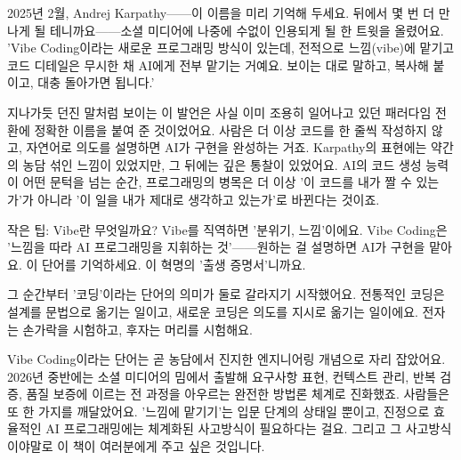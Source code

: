 


2025년 2월, Andrej Karpathy——이 이름을 미리 기억해 두세요. 뒤에서 몇 번 더 만나게 될 테니까요——소셜 미디어에 나중에 수없이 인용되게 될 한 트윗을 올렸어요. 'Vibe Coding이라는 새로운 프로그래밍 방식이 있는데, 전적으로 느낌(vibe)에 맡기고 코드 디테일은 무시한 채 AI에게 전부 맡기는 거예요. 보이는 대로 말하고, 복사해 붙이고, 대충 돌아가면 됩니다.'

지나가듯 던진 말처럼 보이는 이 발언은 사실 이미 조용히 일어나고 있던 패러다임 전환에 정확한 이름을 붙여 준 것이었어요. 사람은 더 이상 코드를 한 줄씩 작성하지 않고, 자연어로 의도를 설명하면 AI가 구현을 완성하는 거죠. Karpathy의 표현에는 약간의 농담 섞인 느낌이 있었지만, 그 뒤에는 깊은 통찰이 있었어요. AI의 코드 생성 능력이 어떤 문턱을 넘는 순간, 프로그래밍의 병목은 더 이상 '이 코드를 내가 짤 수 있는가'가 아니라 '이 일을 내가 제대로 생각하고 있는가'로 바뀐다는 것이죠.

\begin{tcbinfo}{작은 팁: Vibe란 무엇일까요?}
Vibe를 직역하면 '분위기, 느낌'이에요. Vibe Coding은 '느낌을 따라 AI 프로그래밍을 지휘하는 것'——원하는 걸 설명하면 AI가 구현을 맡아요. 이 단어를 기억하세요. 이 혁명의 '출생 증명서'니까요.

\end{tcbinfo}

그 순간부터 '코딩'이라는 단어의 의미가 둘로 갈라지기 시작했어요. 전통적인 코딩은 설계를 문법으로 옮기는 일이고, 새로운 코딩은 의도를 지시로 옮기는 일이에요. 전자는 손가락을 시험하고, 후자는 머리를 시험해요.

Vibe Coding이라는 단어는 곧 농담에서 진지한 엔지니어링 개념으로 자리 잡았어요. 2026년 중반에는 소셜 미디어의 밈에서 출발해 요구사항 표현, 컨텍스트 관리, 반복 검증, 품질 보증에 이르는 전 과정을 아우르는 완전한 방법론 체계로 진화했죠. 사람들은 또 한 가지를 깨달았어요. '느낌에 맡기기'는 입문 단계의 상태일 뿐이고, 진정으로 효율적인 AI 프로그래밍에는 체계화된 사고방식이 필요하다는 걸요. 그리고 그 사고방식이야말로 이 책이 여러분에게 주고 싶은 것입니다.


